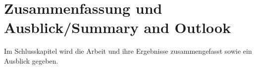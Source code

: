 \chapter{Zusammenfassung und Ausblick/Summary and Outlook}
Im Schlusskapitel wird die Arbeit und ihre Ergebnisse zusammengefasst sowie ein Ausblick gegeben.